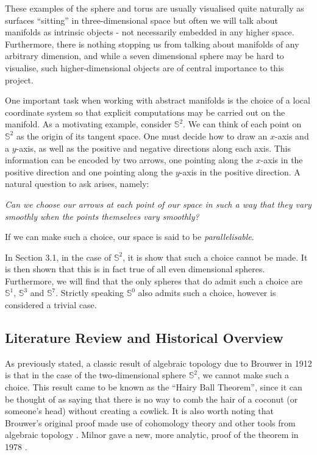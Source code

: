 These examples of the sphere and torus are usually visualised quite naturally as surfaces ``sitting'' in three-dimensional space but often we will talk about manifolds as intrinsic objects - not necessarily embedded in any higher space. Furthermore, there is nothing stopping us from talking about manifolds of any arbitrary dimension, and while a seven dimensional sphere may be hard to visualise, such higher-dimensional objects are of central importance to this project.\\

\pagebreak

One important task when working with abstract manifolds is the choice of a local coordinate system so that explicit computations may be carried out on the manifold. As a motivating example, consider $\mathbb{S}^2$. We can think of each point on $\mathbb{S}^2$ as the origin of its tangent space. One must decide how to draw an $x$-axis and a $y$-axis, as well as the positive and negative directions along each axis. This information can be encoded by two arrows, one pointing along the $x$-axis in the positive direction and one pointing along the $y$-axis in the positive direction. A natural question to ask arises, namely:
\begin{center}
\textit{Can we choose our arrows at each point of our space in such a way that they vary smoothly when the points themselves vary smoothly?}
\end{center} 
If we can make such a choice, our space is said to be \textit{parallelisable}.

In Section 3.1, in the case of $\mathbb{S}^2$, it is show that such a choice cannot be made. It is then shown that this is in fact true of all even dimensional spheres. Furthermore, we will find that the only spheres that do admit such a choice are $\mathbb{S}^1$, $\mathbb{S}^3$ and $\mathbb{S}^7$. Strictly speaking $\mathbb{S}^0$ also admits such a choice, however is considered a trivial case.

\subsection{Literature Review and Historical Overview}
As previously stated, a classic result of algebraic topology due to Brouwer in 1912 \cite{MR1511678} is that in the case of the two-dimensional sphere $\mathbb{S}^2$, we cannot make such a choice. This result came to be known as the ``Hairy Ball Theorem'', since it can be thought of as saying that there is no way to comb the hair of a coconut (or someone's head) without creating a cowlick. It is also worth noting that Brouwer's original proof made use of cohomology theory and other tools from algebraic topology \cite{MR1415833}. Milnor gave a new, more analytic, proof of the theorem in 1978 \cite{MR505523}.\\

